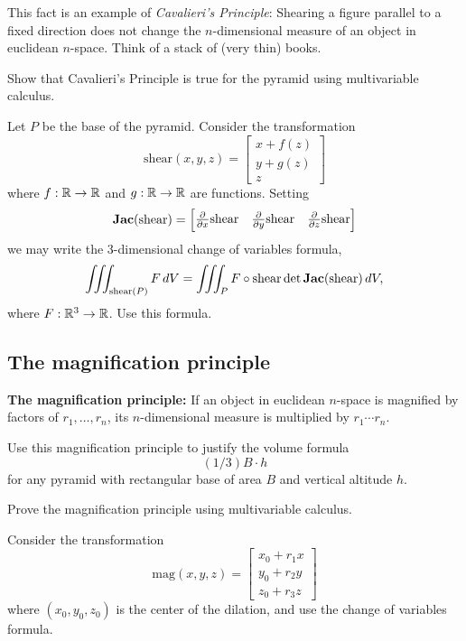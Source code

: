 \documentclass[hints,handout,noauthor,nooutcomes,12pt]{ximera}
\begin{document}
This fact is an example of \textit{Cavalieri's Principle}: Shearing a
figure parallel to a fixed direction does not change the
$n$-dimensional measure of an object in euclidean $n$-space. Think of
a stack of (very thin) books. 






\begin{problem}
Show that Cavalieri's Principle is true for the pyramid using
multivariable calculus.

\begin{hint}
Let $P$ be the base of the pyramid. Consider the transformation%
\[
\mathrm{shear}(x,y,z)=
\begin{bmatrix}
x+ f(z)\\
y+g(z)\\
z
\end{bmatrix}
\]
where $f:\mathbb R\to\mathbb R$ and $g:\mathbb R\to\mathbb R$ are functions. Setting
\[
\mathbf{Jac}(\mathrm{shear}) =
\begin{bmatrix}
  \frac{\partial}{\partial x}\mathrm{shear} &  \frac{\partial}{\partial y}\mathrm{shear}   & \frac{\partial}{\partial z}\mathrm{shear} 
\end{bmatrix}
\]
we may write the 3-dimensional change of variables formula,
\[
\iiint_{\mathrm{shear}(P)} F \,d V=\iiint_P F\circ \mathrm{shear} \det \mathbf{Jac}(\mathrm{shear}) \, dV,
\]
where $F:\mathbb R^3\to\mathbb R$.  Use this formula.
\end{hint}



\end{problem}

\subsection{The magnification principle}

\textbf{The magnification principle:} If an object in euclidean $n$-space is
magnified by factors of $r_{1},\ldots,r_{n}$, its $n$-dimensional
measure is multiplied by $r_{1}\cdots r_{n}$.

\begin{problem}
Use this magnification principle to justify the volume formula%
\[
(1/3)B\cdot h
\]
for any pyramid with rectangular base of area $B$ and vertical altitude $h$.
\end{problem}

\begin{problem}
Prove the magnification principle using multivariable calculus.

\begin{hint}
Consider the transformation%
\[
\mathrm{mag}(x,y,z)=
\begin{bmatrix}
x_0 + r_{1} x \\
y_0 + r_2 y \\
z_0 + r_3 z
\end{bmatrix}
\]
where $(x_0,y_0,z_0)$ is the center of the dilation, and use the
change of variables formula.
\end{hint}
\end{problem}
\end{document}
